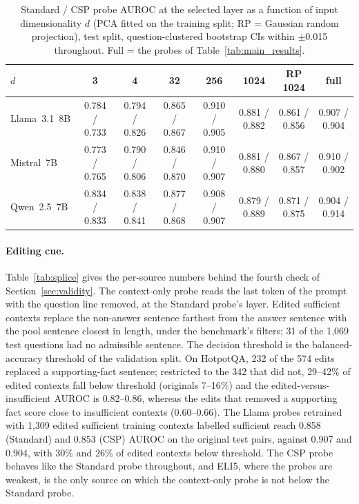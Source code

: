 \documentclass[acmsmall,screen,review]{acmart}
\begin{document}
\begin{table}[h]
\centering
\caption{Standard / CSP probe AUROC at the selected layer as a function of input dimensionality $d$ (PCA fitted on the training split; RP = Gaussian random projection), test split, question-clustered bootstrap CIs within $\pm$0.015 throughout. Full = the probes of Table~\ref{tab:main_results}.}
\label{tab:dimension}
\footnotesize
\setlength{\tabcolsep}{3pt}
\begin{tabular}{lccccccc}
\toprule
$d$ & 3 & 4 & 32 & 256 & 1024 & RP 1024 & full \\
\midrule
Llama~3.1~8B & 0.784 / 0.733 & 0.794 / 0.826 & 0.865 / 0.867 & 0.910 / 0.905 & 0.881 / 0.882 & 0.861 / 0.856 & 0.907 / 0.904 \\
Mistral~7B & 0.773 / 0.765 & 0.790 / 0.806 & 0.846 / 0.870 & 0.910 / 0.907 & 0.881 / 0.880 & 0.867 / 0.857 & 0.910 / 0.902 \\
Qwen~2.5~7B & 0.834 / 0.833 & 0.838 / 0.841 & 0.877 / 0.868 & 0.908 / 0.907 & 0.879 / 0.889 & 0.871 / 0.875 & 0.904 / 0.914 \\
\bottomrule
\end{tabular}
\end{table}

\paragraph{Editing cue.} Table~\ref{tab:splice} gives the per-source numbers behind the fourth check of Section~\ref{sec:validity}. The context-only probe reads the last token of the prompt with the question line removed, at the Standard probe's layer. Edited sufficient contexts replace the non-answer sentence farthest from the answer sentence with the pool sentence closest in length, under the benchmark's filters; 31 of the 1,069 test questions had no admissible sentence. The decision threshold is the balanced-accuracy threshold of the validation split. On HotpotQA, 232 of the 574 edits replaced a supporting-fact sentence; restricted to the 342 that did not, 29--42\% of edited contexts fall below threshold (originals 7--16\%) and the edited-versus-insufficient AUROC is 0.82--0.86, whereas the edits that removed a supporting fact score close to insufficient contexts (0.60--0.66). The Llama probes retrained with 1,309 edited sufficient training contexts labelled sufficient reach 0.858 (Standard) and 0.853 (CSP) AUROC on the original test pairs, against 0.907 and 0.904, with 30\% and 26\% of edited contexts below threshold. The CSP probe behaves like the Standard probe throughout, and ELI5, where the probes are weakest, is the only source on which the context-only probe is not below the Standard probe.
\end{document}
